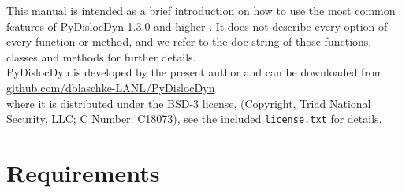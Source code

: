 \documentclass[11pt,letterpaper,oneside,pdftex]{article}
\begin{document}
\noindent
This manual is intended as a brief introduction on how to use the most common features of PyDislocDyn 1.3.0 and higher \cite{pydislocdyn}.
It does not describe every option of every function or method, and we refer to the doc-string of those functions, classes and methods for further details.
\\
PyDislocDyn is developed by the present author and can be downloaded from
\\\href{https://github.com/dblaschke-LANL/PyDislocDyn}{github.com/dblaschke-LANL/PyDislocDyn}\\
where it is distributed under the BSD-3 license, (Copyright, Triad National Security, LLC; C Number: \href{https://doi.org/10.11578/dc.20180619.15}{C18073}), see the included \verb|license.txt| for details.


\section{Requirements}
\end{document}
